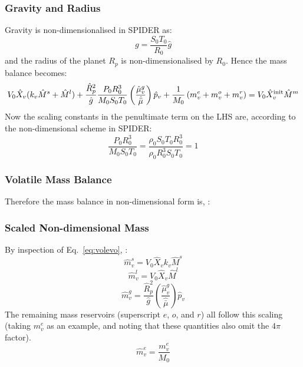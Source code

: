 \subsubsection{Gravity and Radius}
Gravity is non-dimensionalised in SPIDER as:
\begin{equation}
g = \frac{S_0 T_0}{R_0} \hat{g}
\end{equation}
and the radius of the planet $R_p$ is non-dimensionalised by $R_0$.  Hence the mass balance becomes:
\begin{equation}
V_0 \hat{X}_v (k_v \hat{M}^s + \hat{M}^l) + \frac{\hat{R}_p^2}{\hat{g}}\frac{P_0 R_0^3}{M_0 S_0 T_0} \left( \frac{\hat{\mu}_v^g}{\hat{\bar{\mu}}} \right) \hat{p}_v + \frac{1}{M_0} \left( m_v^e + m_v^o + m_v^r \right) = V_0 \hat{X}_v^{\rm init} \hat{M}^m
\end{equation}
Now the scaling constants in the penultimate term on the LHS are, according to the non-dimensional scheme in SPIDER:
\begin{equation}
\frac{P_0 R_0^3}{M_0 S_0 T_0} = \frac{\rho_0 S_0 T_0 R_0^3}{\rho_0 R_0^3 S_0 T_0} = 1
\end{equation}
\subsubsection{Volatile Mass Balance}
Therefore the mass balance in non-dimensional form is, :
\subsubsection{Scaled Non-dimensional Mass}
By inspection of Eq.~\ref{eq:volevo}, :
\begin{equation}
\hat{m}_v^s = V_0 \hat{X}_v k_v \hat{M}^s
\end{equation}
\begin{equation}
\hat{m}_v^l = V_0 \hat{X}_v \hat{M}^l
\end{equation}
\begin{equation}
\hat{m}_v^g = \frac{\hat{R}_p^2}{\hat{g}} \left( \frac{\hat{\mu}_v^g}{\hat{\bar{\mu}}} \right) \hat{p}_v
\end{equation}
The remaining mass reservoirs (superscript $e$, $o$, and $r$) all follow this scaling (taking $m_v^e$ as an example, and noting that these quantities also omit the $4 \pi$ factor).
\begin{equation}
\hat{m}_v^e = \frac{m_v^e}{M_0}
\end{equation}
